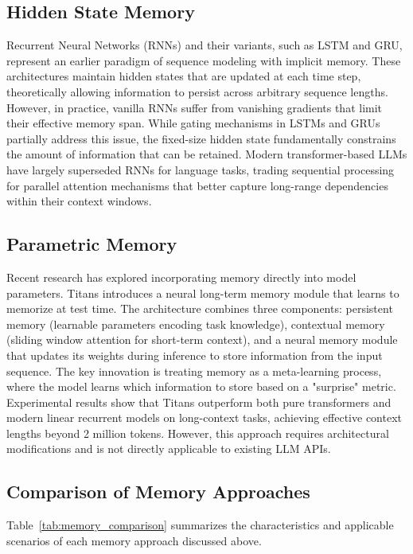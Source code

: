 \documentclass{article} %
\begin{document}
\subsection{Hidden State Memory}

Recurrent Neural Networks (RNNs) and their variants, such as LSTM and GRU, represent an earlier paradigm of sequence modeling with implicit memory. These architectures maintain hidden states that are updated at each time step, theoretically allowing information to persist across arbitrary sequence lengths. However, in practice, vanilla RNNs suffer from vanishing gradients that limit their effective memory span. While gating mechanisms in LSTMs and GRUs partially address this issue, the fixed-size hidden state fundamentally constrains the amount of information that can be retained. Modern transformer-based LLMs have largely superseded RNNs for language tasks, trading sequential processing for parallel attention mechanisms that better capture long-range dependencies within their context windows.

\subsection{Parametric Memory}

Recent research has explored incorporating memory directly into model parameters. Titans \citep{behrouz2024titans} introduces a neural long-term memory module that learns to memorize at test time. The architecture combines three components: persistent memory (learnable parameters encoding task knowledge), contextual memory (sliding window attention for short-term context), and a neural memory module that updates its weights during inference to store information from the input sequence. The key innovation is treating memory as a meta-learning process, where the model learns which information to store based on a "surprise" metric. Experimental results show that Titans outperform both pure transformers and modern linear recurrent models on long-context tasks, achieving effective context lengths beyond 2 million tokens. However, this approach requires architectural modifications and is not directly applicable to existing LLM APIs.

\subsection{Comparison of Memory Approaches}

Table~\ref{tab:memory_comparison} summarizes the characteristics and applicable scenarios of each memory approach discussed above.
\end{document}
